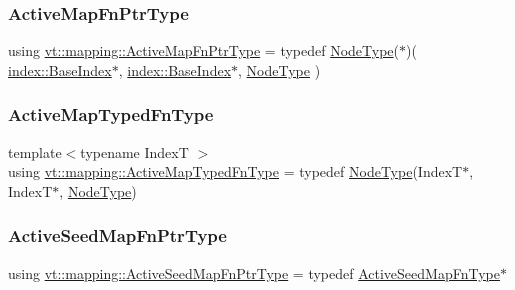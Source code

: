 \subsubsection{\texorpdfstring{Active\+Map\+Fn\+Ptr\+Type}{ActiveMapFnPtrType}}
{\footnotesize\ttfamily using \hyperlink{namespacevt_1_1mapping_a748d5efb71ca5878288d5809f57d7254}{vt\+::mapping\+::\+Active\+Map\+Fn\+Ptr\+Type} = typedef \hyperlink{namespacevt_a866da9d0efc19c0a1ce79e9e492f47e2}{Node\+Type}($\ast$)( \hyperlink{structvt_1_1index_1_1_base_index}{index\+::\+Base\+Index}$\ast$, \hyperlink{structvt_1_1index_1_1_base_index}{index\+::\+Base\+Index}$\ast$, \hyperlink{namespacevt_a866da9d0efc19c0a1ce79e9e492f47e2}{Node\+Type} )}

\mbox{\label{namespacevt_1_1mapping_ad7c0812428b339edd904a865e0080ecd}} 
\subsubsection{\texorpdfstring{Active\+Map\+Typed\+Fn\+Type}{ActiveMapTypedFnType}}
{\footnotesize\ttfamily template$<$typename IndexT $>$ \\
using \hyperlink{namespacevt_1_1mapping_ad7c0812428b339edd904a865e0080ecd}{vt\+::mapping\+::\+Active\+Map\+Typed\+Fn\+Type} = typedef \hyperlink{namespacevt_a866da9d0efc19c0a1ce79e9e492f47e2}{Node\+Type}(IndexT$\ast$, IndexT$\ast$, \hyperlink{namespacevt_a866da9d0efc19c0a1ce79e9e492f47e2}{Node\+Type})}

\mbox{\label{namespacevt_1_1mapping_a254b50d55be91c3bd002481b2e96da7e}} 
\subsubsection{\texorpdfstring{Active\+Seed\+Map\+Fn\+Ptr\+Type}{ActiveSeedMapFnPtrType}}
{\footnotesize\ttfamily using \hyperlink{namespacevt_1_1mapping_a254b50d55be91c3bd002481b2e96da7e}{vt\+::mapping\+::\+Active\+Seed\+Map\+Fn\+Ptr\+Type} = typedef \hyperlink{namespacevt_1_1mapping_ab9cfcd87eb3ff00e63478d0197056b7e}{Active\+Seed\+Map\+Fn\+Type}$\ast$}

